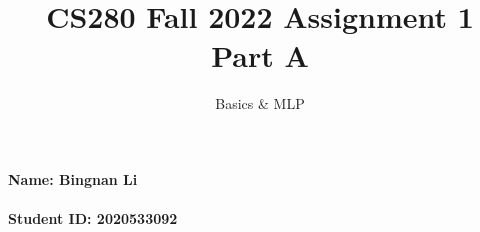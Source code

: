 \documentclass[12pt]{article}%
\begin{document}
\title{CS280 Fall 2022 Assignment 1 \\ Part A}
\author{Basics \& MLP}
\maketitle

\paragraph{Name: Bingnan Li}

\paragraph{Student ID: 2020533092}

\newpage


\end{document}
